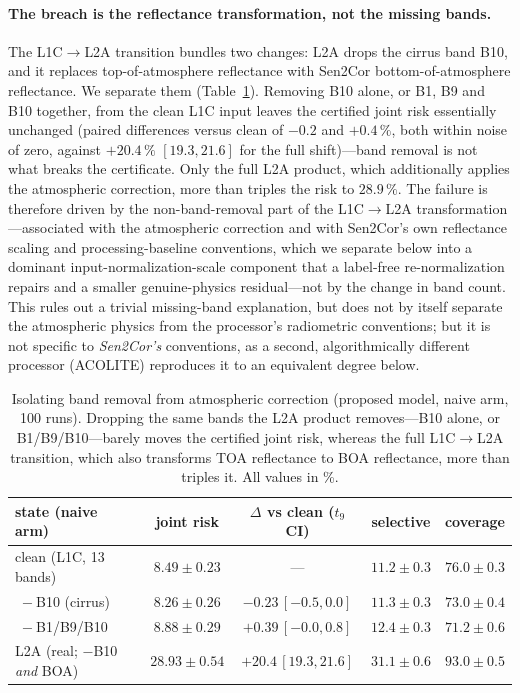 \documentclass[preprint,3p,times]{elsarticle}
\begin{document}
\paragraph{The breach is the reflectance transformation, not the missing bands.} The L1C$\to$L2A transition bundles two changes: L2A drops the cirrus band B10, and it replaces top-of-atmosphere reflectance with Sen2Cor bottom-of-atmosphere reflectance. We separate them (Table~\ref{tab:banddrop}). Removing B10 alone, or B1, B9 and B10 together, from the clean L1C input leaves the certified joint risk essentially unchanged (paired differences versus clean of $-0.2$ and $+0.4\,\%$, both within noise of zero, against $+20.4\,\%$ $[19.3,21.6]$ for the full shift)---band removal is not what breaks the certificate. Only the full L2A product, which additionally applies the atmospheric correction, more than triples the risk to $28.9\,\%$. The failure is therefore driven by the non-band-removal part of the L1C$\to$L2A transformation---associated with the atmospheric correction and with Sen2Cor's own reflectance scaling and processing-baseline conventions, which we separate below into a dominant input-normalization-scale component that a label-free re-normalization repairs and a smaller genuine-physics residual---not by the change in band count. This rules out a trivial missing-band explanation, but does not by itself separate the atmospheric physics from the processor's radiometric conventions; but it is not specific to \emph{Sen2Cor's} conventions, as a second, algorithmically different processor (ACOLITE) reproduces it to an equivalent degree below.

\begin{table}[t]
\centering
\caption{Isolating band removal from atmospheric correction (proposed model, naive arm, 100 runs). Dropping the same bands the L2A product removes---B10 alone, or B1/B9/B10---barely moves the certified joint risk, whereas the full L1C$\to$L2A transition, which also transforms TOA reflectance to BOA reflectance, more than triples it. All values in \%.}
\label{tab:banddrop}
\begin{tabular}{lcccc}
\toprule
state (naive arm) & joint risk & $\Delta$ vs clean ($t_9$ CI) & selective & coverage \\
\midrule
clean (L1C, 13 bands)              & $8.49\pm0.23$ & --- & $11.2\pm0.3$ & $76.0\pm0.3$ \\
$\;-$B10 (cirrus)                  & $8.26\pm0.26$ & $-0.23\,[-0.5,0.0]$ & $11.3\pm0.3$ & $73.0\pm0.4$ \\
$\;-$B1/B9/B10                     & $8.88\pm0.29$ & $+0.39\,[-0.0,0.8]$ & $12.4\pm0.3$ & $71.2\pm0.6$ \\
L2A (real; $-$B10 \emph{and} BOA)  & $\mathbf{28.93\pm0.54}$ & $\mathbf{+20.4\,[19.3,21.6]}$ & $31.1\pm0.6$ & $93.0\pm0.5$ \\
\bottomrule
\end{tabular}
\end{table}
\end{document}
